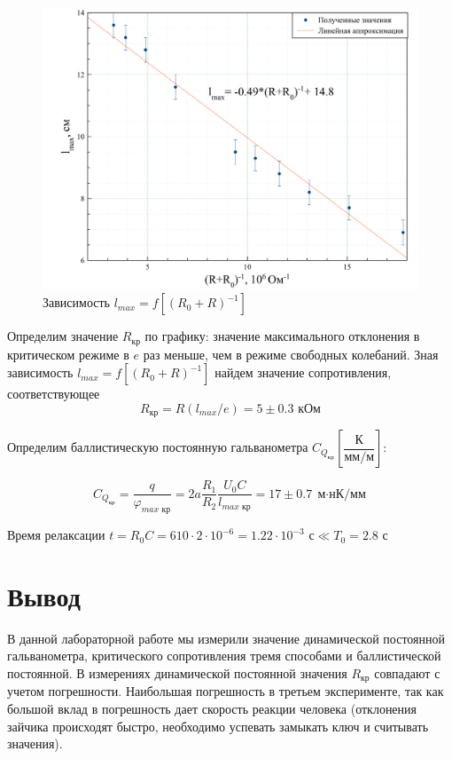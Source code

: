 \documentclass[a4paper, 12pt]{article}
\begin{document}
\begin {figure}[H]
	\begin{center}
		\includegraphics[width = 0.8 \textwidth]{GraphC}
		\caption{Зависимость $l_{max} = f[(R_0+R)^{-1}]$}
	\end{center}
\end {figure}

Определим значение $R_\text{кр}$ по графику: значение максимального отклонения в критическом режиме в $e$ раз меньше, чем в режиме свободных колебаний. Зная зависимость $l_{max} = f[(R_0+R)^{-1}]$ найдем значение сопротивления, соответствующее 
$$R_\text{кр} = R(l_{max}/e) = 5 \pm 0.3 \text{ кОм}$$

Определим баллистическую постоянную гальванометра $C_{Q_\text{кр}} \left[\dfrac{\text{К}}{\text{мм/м}} \right]$:

$$C_{Q_\text{кр}} = \dfrac{q}{\varphi_{max \text{ кр}}} = 2a \dfrac{R_1}{R_2} \dfrac{U_0C}{l_{max \text{ кр}}} = 17 \pm 0.7 \; \text{м$\cdot$нК/мм}$$

Время релаксации $t = R_0C = 610 \cdot 2 \cdot 10^{-6} = 1.22 \cdot 10^{-3} \text{ с} \ll T_0 = 2.8 \text{ с}$

\section{Вывод}

В данной лабораторной работе мы измерили значение динамической постоянной гальванометра, критического сопротивления тремя способами и баллистической постоянной. В измерениях динамической постоянной значения $R_\text{кр}$ совпадают с учетом погрешности. Наибольшая погрешность в третьем эксперименте, так как большой вклад в погрешность дает скорость реакции человека (отклонения зайчика происходят быстро, необходимо успевать замыкать ключ и считывать значения).
\end{document}
